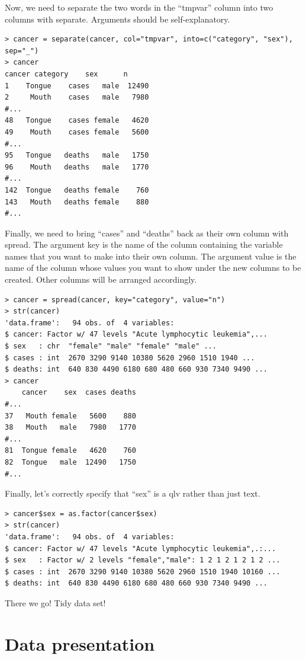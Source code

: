 \documentclass{report}
\newcommand{\code}[1]{\textsf{\ttfamily #1}}
\begin{document}
		Now, we need to separate the two words in the ``tmpvar'' column into two columns with \code{separate}. Arguments should be self-explanatory.
		\begin{verbatim}
> cancer = separate(cancer, col="tmpvar", into=c("category", "sex"), sep="_")
> cancer
cancer category    sex      n
1    Tongue    cases   male  12490
2     Mouth    cases   male   7980
#...
48   Tongue    cases female   4620
49    Mouth    cases female   5600
#...
95   Tongue   deaths   male   1750
96    Mouth   deaths   male   1770
#...
142  Tongue   deaths female    760
143   Mouth   deaths female    880
#...
		\end{verbatim}
		
		Finally, we need to bring ``cases'' and ``deaths'' back as their own column with \code{spread}. The argument \code{key} is the name of the column containing the variable names that you want to make into their own column. The argument \code{value} is the name of the column whose values you want to show under the new columns to be created. Other columns will be arranged accordingly.
		\begin{verbatim}
> cancer = spread(cancer, key="category", value="n")
> str(cancer)
'data.frame':   94 obs. of  4 variables:
$ cancer: Factor w/ 47 levels "Acute lymphocytic leukemia",...
$ sex   : chr  "female" "male" "female" "male" ...
$ cases : int  2670 3290 9140 10380 5620 2960 1510 1940 ...
$ deaths: int  640 830 4490 6180 680 480 660 930 7340 9490 ...
> cancer
    cancer    sex  cases deaths
#...
37   Mouth female   5600    880
38   Mouth   male   7980   1770
#...
81  Tongue female   4620    760
82  Tongue   male  12490   1750
#...
		\end{verbatim}
		
		Finally, let's correctly specify that ``sex'' is a \gls{qlv} rather than just text.
		\begin{verbatim}
> cancer$sex = as.factor(cancer$sex)
> str(cancer)
'data.frame':   94 obs. of  4 variables:
$ cancer: Factor w/ 47 levels "Acute lymphocytic leukemia",.:...
$ sex   : Factor w/ 2 levels "female","male": 1 2 1 2 1 2 1 2 ...
$ cases : int  2670 3290 9140 10380 5620 2960 1510 1940 10160 ...
$ deaths: int  640 830 4490 6180 680 480 660 930 7340 9490 ...

		\end{verbatim}
		
		There we go! Tidy data set!

\chapter{Data presentation}
\end{document}
